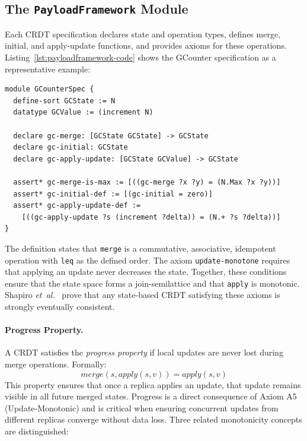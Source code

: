 \subsection{The \texttt{PayloadFramework} Module}

Each CRDT specification declares state and operation types, defines merge, initial, and apply-update functions, and provides axioms for these operations. Listing~\ref{lst:payloadframework-code} shows the GCounter specification as a representative example:\\

\begin{lstlisting}[language=Athena,style=athena,label={lst:payloadframework-code},caption={GCounter specification showing CRDT pattern}]
module GCounterSpec {
  define-sort GCState := N
  datatype GCValue := (increment N)
  
  declare gc-merge: [GCState GCState] -> GCState
  declare gc-initial: GCState
  declare gc-apply-update: [GCState GCValue] -> GCState
  
  assert* gc-merge-is-max := [((gc-merge ?x ?y) = (N.Max ?x ?y))]
  assert* gc-initial-def := [(gc-initial = zero)]
  assert* gc-apply-update-def :=
    [((gc-apply-update ?s (increment ?delta)) = (N.+ ?s ?delta))]
}
\end{lstlisting}

The definition states that \texttt{merge} is a commutative, associative, idempotent operation with \texttt{leq} as the defined order. The axiom \texttt{update-monotone} requires that applying an update never decreases the state. Together, these conditions ensure that the state space forms a join-semilattice and that \texttt{apply} is monotonic. Shapiro \emph{et~al.}~\cite{shapiro2011conflict} prove that any state-based CRDT satisfying these axioms is strongly eventually consistent.

\paragraph{Progress Property.}
A CRDT satisfies the \emph{progress property} if local updates are never lost during merge operations. Formally:
\[
  \mathit{merge}(s, \mathit{apply}(s, v)) = \mathit{apply}(s, v)
\]
This property ensures that once a replica applies an update, that update remains visible in all future merged states. Progress is a direct consequence of Axiom A5 (Update-Monotonic) and is critical when ensuring concurrent updates from different replicas converge without data loss. Three related monotonicity concepts are distinguished:

